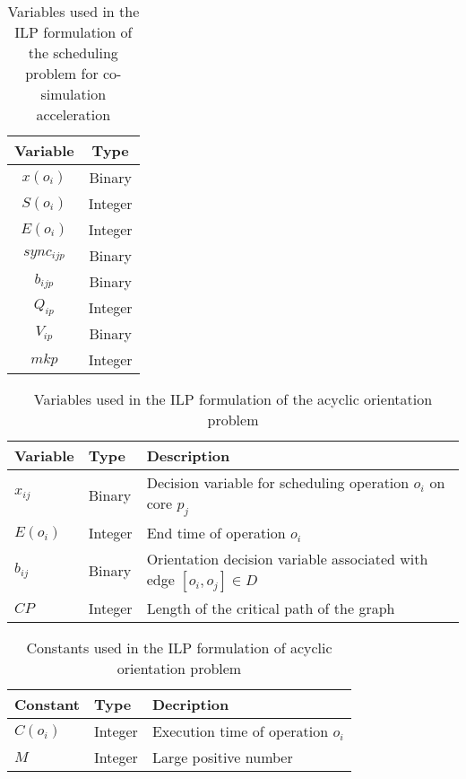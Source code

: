 \begin{table}
\caption{Variables used in the ILP formulation of the scheduling problem for co-simulation acceleration}
\centering
\label{tab:varilpsched}
\begin{tabular}{c c}
\toprule
Variable & Type \\
\midrule
 $x(o_i)$ & Binary  \\
$S(o_i)$ & Integer   \\
$E(o_i)$ & Integer  \\
$sync_{ijp}$ & Binary   \\
$b_{ijp}$ & Binary  \\
$Q_{ip}$ & Integer  \\
$V_{ip}$ & Binary  \\
$mkp$ & Integer  \\

\bottomrule
\end{tabular}
\end{table}

\begin{table}[!htbp]
\caption{Variables used in the ILP formulation of the acyclic orientation problem}
\centering
\label{table:varilporient}
\begin{tabular}{l l l}
\toprule
Variable & Type & Description  \\
\midrule
 $x_{ij}$ & Binary & Decision variable for scheduling operation $o_i$ on core $p_j$\\
 $E(o_i)$ & Integer & End time of operation $o_i$\\
 $b_{ij}$ & Binary & Orientation decision variable associated with edge $[o_i,o_j] \in D$\\
 $CP$ & Integer & Length of the critical path of the graph\\
\bottomrule
\end{tabular}
\end{table}

\begin{table}[!htbp]
\caption{Constants used in the ILP formulation of acyclic orientation problem}
\centering
\label{table:consilporient}
\begin{tabular}{l l l}
\toprule
Constant & Type & Decription\\
\midrule
 $C(o_i)$ & Integer & Execution time of operation $o_i$\\
 $M$ & Integer & Large positive number\\
\bottomrule
\end{tabular}
\end{table}

